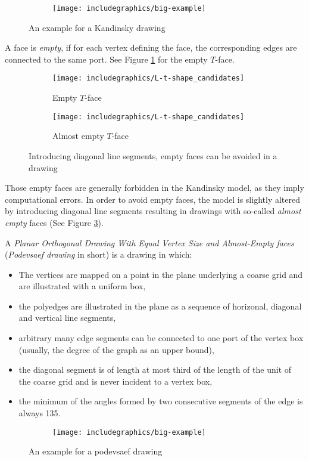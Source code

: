 \begin{figure}[H]
	\centering
	\begin{subfigure}{0.3\textwidth}
		\centering
		\texttt{[image: includegraphics/big-example]}
	\end{subfigure}
	\caption{An example for a Kandinsky drawing}
\end{figure}
A face is \textit{empty}, if for each vertex defining the face, the corresponding edges are connected to the same port. See Figure \ref{im:empty_T} for the empty $T$-face. 
\begin{figure}[H]
	\centering
	\begin{subfigure}{0.4\textwidth}
		\centering
		\texttt{[image: includegraphics/L-t-shape\_candidates]}
		\caption{Empty $T$-face}\label{im:empty_T}	
\end{subfigure}
	\begin{subfigure}{0.4\textwidth}
		\centering
		\texttt{[image: includegraphics/L-t-shape\_candidates]}
		\caption{Almost empty $T$-face}\label{im:almost_empty_T}
	\end{subfigure}
	\caption{Introducing diagonal line segments, empty faces can be avoided in a drawing}
\end{figure}
Those empty faces are generally forbidden in the Kandinsky model, as they imply computational errors. In order to avoid empty faces, the model is slightly altered by introducing diagonal line segments resulting in drawings with so-called \textit{almost empty} faces (See Figure \ref{im:almost_empty_T}).
\begin{definition}
	A \textit{Planar Orthogonal Drawing With Equal Vertex Size and Almost-Empty faces} (\textit{Podevsaef drawing} in short) is a drawing in which:
	\begin{itemize}
		\item The vertices are mapped on a point in the plane underlying a coarse grid and are illustrated with a uniform box,
		\item the polyedges are illustrated in the plane as a sequence of horizonal, diagonal and vertical line segments,
		\item arbitrary many edge segments can be connected to one port of the vertex box (usually, the degree of the graph as an upper bound),
		\item the diagonal segment is of length at most third of the length of the unit of the coarse grid and is never incident to a vertex box,
		\item the minimum of the angles formed by two consecutive segments of the edge is always 135\degree.
	\end{itemize}\label{def:podevsaef}
\end{definition}
\begin{figure}[H]
	\centering
	\begin{subfigure}{0.3\textwidth}
		\centering
		\texttt{[image: includegraphics/big-example]}
	\end{subfigure}
	\caption{An example for a podevsaef drawing}
\end{figure}
